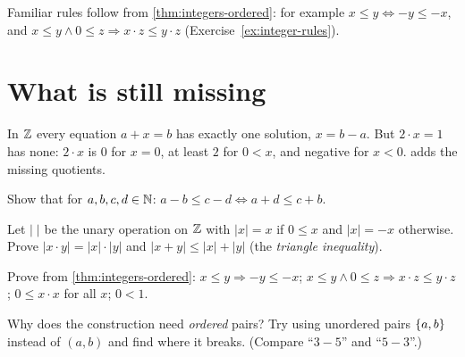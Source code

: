 Familiar rules follow from \cref{thm:integers-ordered}: for example $x \le y
\Leftrightarrow -y \le -x$, and $x \le y \land 0 \le z \Rightarrow x \cdot z \le y
\cdot z$ (Exercise~\ref{ex:integer-rules}).

\section{What is still missing}

In $\mathbb{Z}$ every equation $a + x = b$ has exactly one solution, $x = b - a$. But $2
\cdot x = 1$ has none: $2 \cdot x$ is $0$ for $x = 0$, at least $2$ for $0 < x$,
and negative for $x < 0$.  adds the missing quotients.

\begin{exercises}
  \item Show that for $a, b, c, d \in \mathbb{N}$: $a - b \le c - d \Leftrightarrow a + d
    \le c + b$.
  \item Let $|\;|$ be the unary operation on $\mathbb{Z}$ with $|x| = x$ if $0 \le x$ and
    $|x| = -x$ otherwise. Prove $|x \cdot y| = |x| \cdot |y|$ and $|x + y| \le |x| +
    |y|$ (the \emph{triangle inequality}).
  \item \label{ex:integer-rules}
    Prove from \cref{thm:integers-ordered}: $x \le y \Rightarrow -y \le -x$; $x \le
    y \land 0 \le z \Rightarrow x \cdot z \le y \cdot z$; $0 \le x \cdot x$ for
    all $x$; $0 < 1$.
  \item Why does the construction need \emph{ordered} pairs? Try using unordered
    pairs $\lbrace a, b \rbrace$ instead of $(a, b)$ and find where it breaks. (Compare
    \enquote{$3 - 5$} and \enquote{$5 - 3$}.)
\end{exercises}
